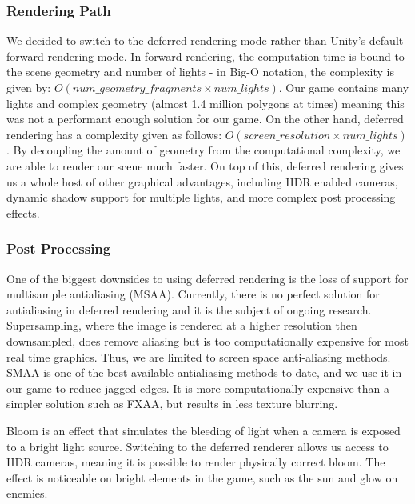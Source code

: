 \documentclass[a4paper,11pt]{article}
\begin{document}
\subsubsection{Rendering Path}
We decided to switch to the deferred rendering mode rather than Unity’s default forward rendering mode. In forward rendering, the computation time is bound to the scene geometry and number of lights - in Big-O notation, the complexity is given by: $O(num\_geometry\_fragments \times num\_lights)$. Our game contains many lights and complex geometry (almost 1.4 million polygons at times) meaning this was not a performant enough solution for our game. On the other hand, deferred rendering has a complexity given as follows: $O(screen\_resolution \times num\_lights)$. By decoupling the amount of geometry from the computational complexity, we are able to render our scene much faster. On top of this, deferred rendering gives us a whole host of other graphical advantages, including HDR enabled cameras, dynamic shadow support for multiple lights, and more complex post processing effects.

\subsubsection{Post Processing}
One of the biggest downsides to using deferred rendering is the loss of support for multisample antialiasing (MSAA). Currently, there is no perfect solution for antialiasing in deferred rendering and it is the subject of ongoing research. Supersampling, where the image is rendered at a higher resolution then downsampled, does remove aliasing but is too computationally expensive for most real time graphics. Thus, we are limited to screen space anti-aliasing methods. SMAA is one of the best available antialiasing methods to date, and we use it in our game to reduce jagged edges. It is more computationally expensive than a simpler solution such as FXAA, but results in less texture blurring.

Bloom is an effect that simulates the bleeding of light when a camera is exposed to a bright light source. Switching to the deferred renderer allows us access to HDR cameras, meaning it is possible to render physically correct bloom. The effect is noticeable on bright elements in the game, such as the sun and glow on enemies.
\end{document}
